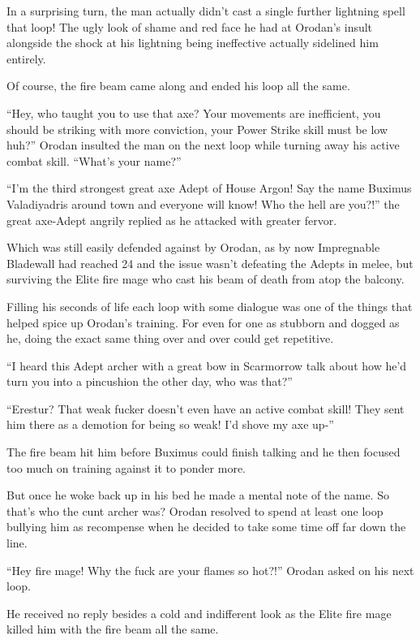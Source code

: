 \documentclass[a4paper,10pt]{book}
\begin{document}
In a surprising turn, the man actually didn’t cast a single further lightning spell that loop! The ugly look of shame and red face he had at Orodan’s insult alongside the shock at his lightning being ineffective actually sidelined him entirely.\par
Of course, the fire beam came along and ended his loop all the same.\par
“Hey, who taught you to use that axe? Your movements are inefficient, you should be striking with more conviction, your Power Strike skill must be low huh?” Orodan insulted the man on the next loop while turning away his active combat skill. “What’s your name?”\par
“I’m the third strongest great axe Adept of House Argon! Say the name Buximus Valadiyadris around town and everyone will know! Who the hell are you?!” the great axe-Adept angrily replied as he attacked with greater fervor.\par
Which was still easily defended against by Orodan, as by now Impregnable Bladewall had reached 24 and the issue wasn’t defeating the Adepts in melee, but surviving the Elite fire mage who cast his beam of death from atop the balcony.\par
Filling his seconds of life each loop with some dialogue was one of the things that helped spice up Orodan’s training. For even for one as stubborn and dogged as he, doing the exact same thing over and over could get repetitive.\par
“I heard this Adept archer with a great bow in Scarmorrow talk about how he’d turn you into a pincushion the other day, who was that?”\par
“Erestur? That weak fucker doesn’t even have an active combat skill! They sent him there as a demotion for being so weak! I’d shove my axe up-”\par
The fire beam hit him before Buximus could finish talking and he then focused too much on training against it to ponder more.\par
But once he woke back up in his bed he made a mental note of the name. So that’s who the cunt archer was? Orodan resolved to spend at least one loop bullying him as recompense when he decided to take some time off far down the line.\par
“Hey fire mage! Why the fuck are your flames so hot?!” Orodan asked on his next loop.\par
He received no reply besides a cold and indifferent look as the Elite fire mage killed him with the fire beam all the same.\par
\end{document}
